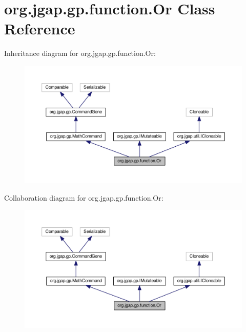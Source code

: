\hypertarget{classorg_1_1jgap_1_1gp_1_1function_1_1_or}{\section{org.\-jgap.\-gp.\-function.\-Or Class Reference}
\label{classorg_1_1jgap_1_1gp_1_1function_1_1_or}
}


Inheritance diagram for org.\-jgap.\-gp.\-function.\-Or\-:
\nopagebreak
\begin{figure}[H]
\begin{center}
\leavevmode
\includegraphics[width=350pt]{classorg_1_1jgap_1_1gp_1_1function_1_1_or__inherit__graph}
\end{center}
\end{figure}


Collaboration diagram for org.\-jgap.\-gp.\-function.\-Or\-:
\nopagebreak
\begin{figure}[H]
\begin{center}
\leavevmode
\includegraphics[width=350pt]{classorg_1_1jgap_1_1gp_1_1function_1_1_or__coll__graph}
\end{center}
\end{figure}
